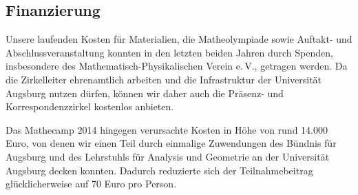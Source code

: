 \documentclass[12pt]{zettel}
\begin{document}
% 
% 
% 
% 

\subsection*{Finanzierung}

Unsere laufenden Kosten für Materialien, die Matheolympiade sowie Auftakt- und Abschlussveranstaltung konnten in den letzten beiden Jahren durch Spenden, insbesondere des Mathematisch-Physikalischen Verein e.\,V., getragen werden. Da die Zirkelleiter ehrenamtlich arbeiten und die Infrastruktur der Universität Augsburg nutzen dürfen, können wir daher auch die Präsenz- und Korrespondenzzirkel kostenlos anbieten.

Das Mathecamp 2014 hingegen verursachte Kosten in Höhe von rund 14.000 Euro, von denen wir einen Teil durch einmalige Zuwendungen des Bündnis für Augsburg und des Lehrstuhls für Analysis und Geometrie an der Universität Augsburg decken konnten. Dadurch reduzierte sich der Teilnahmebeitrag glücklicherweise auf 70 Euro pro Person.
\end{document}
